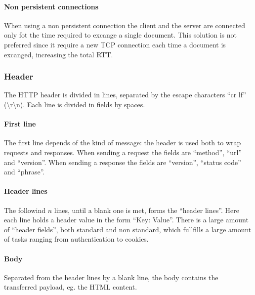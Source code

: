 \paragraph{Non persistent connections}
When using a non persistent connection the client and the server are connected only fot the time required to excange a single document. This solution is not preferred since it require a new TCP connection each time a document is excanged, increasing the total RTT.

\subsubsection{Header}

The HTTP header is divided in lines, separated by the escape characters ``cr lf'' (\textbackslash r\textbackslash n).
Each line is divided in fields by spaces.

\paragraph{First line}
The first line depends of the kind of message: the header is used both to wrap requests and responses. When sending a request the fields are ``method'', ``url'' and ``version''. When sending a response the fields are ``version'', ``status code'' and ``phrase''.

\paragraph{Header lines}
The followind $n$ lines, until a blank one is met, forms the ``header lines''. Here each line holds a header value in the form ``Key: Value''. There is a large amount of ``header fields'', both standard and non standard, which fullfills a large amount of tasks ranging from authentication to cookies.

\paragraph{Body}
Separated from the header lines by a blank line, the body contains the transferred payload, eg. the HTML content.

